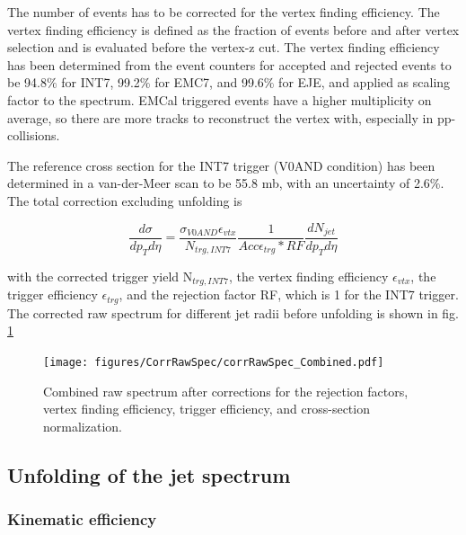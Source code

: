 \documentclass[ALICE]{ALICE_analysis_notes}
\begin{document}
The number of events has to be corrected for the vertex finding efficiency. The vertex finding efficiency is defined as the fraction of events before and after vertex selection and is evaluated before the vertex-z cut. The vertex finding efficiency has been determined from the event counters for accepted and rejected events to be 94.8$\%$ for INT7, 99.2$\%$ for EMC7, and 99.6$\%$ for EJE, and applied as scaling factor to the spectrum. EMCal triggered events have a higher multiplicity on average, so there are more tracks to reconstruct the vertex with, especially in pp-collisions.

The reference cross section for the INT7 trigger (V0AND condition) has been determined in a van-der-Meer scan to be 55.8 mb, with an uncertainty of 2.6$\%$. The total correction excluding unfolding is

\begin{equation}
   \frac{d\sigma}{dp_T d\eta} = \frac{\sigma_{V0AND}\epsilon_{vtx}}{N_{trg,INT7}} \frac{1}{Acc\epsilon_{trg}*RF} \frac{dN_{jet}}{dp_T d\eta}
\end{equation}

with the corrected trigger yield N$_{trg,INT7}$, the vertex finding efficiency $\epsilon_{vtx}$, the trigger efficiency $\epsilon_{trg}$, and the rejection factor RF, which is 1 for the INT7 trigger. The corrected raw spectrum for different jet radii before unfolding is shown in fig. \ref{fig:CombinedRawSpec}

\begin{figure}
    \centering
    \texttt{[image: figures/CorrRawSpec/corrRawSpec\_Combined.pdf]}
    \vfill\null
    \caption{Combined raw spectrum after corrections for the rejection factors, vertex finding efficiency, trigger efficiency, and cross-section normalization.}
    \label{fig:CombinedRawSpec}
\end{figure}

\subsection{Unfolding of the jet spectrum}
\label{sec:unfolding}
\subsubsection{Kinematic efficiency}
\label{subsec:kinEff}
\end{document}
